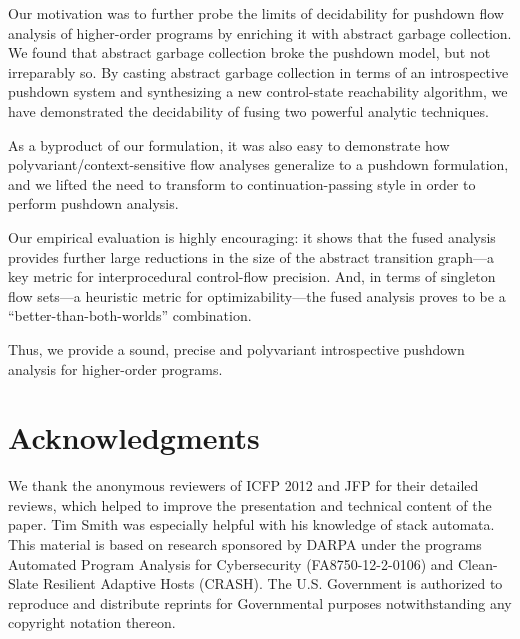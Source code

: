 Our motivation was to further probe the limits of decidability
for pushdown flow analysis of higher-order programs
by enriching it with abstract garbage collection.
We found that abstract garbage collection broke
the pushdown model, but not irreparably so.
By casting abstract garbage collection in terms of
an introspective pushdown system and synthesizing
a new control-state reachability algorithm, we have 
demonstrated the decidability of fusing two
powerful analytic techniques.

As a byproduct of our formulation, it was also easy
to demonstrate how polyvariant/context-sensitive 
flow analyses generalize to a pushdown formulation,
and we lifted the need to transform to continuation-passing style
in order to perform pushdown analysis.


Our empirical evaluation is highly encouraging: it shows that the fused
analysis provides further large reductions in the size of the abstract
transition graph---a key metric for interprocedural control-flow precision.
And, in terms of singleton flow sets---a heuristic metric for optimizability---the fused 
analysis proves to be a ``better-than-both-worlds'' combination.

Thus, we provide a sound, precise and polyvariant introspective
pushdown analysis for higher-order programs.



\section*{Acknowledgments}
We thank the anonymous reviewers of ICFP 2012 and JFP for their
detailed reviews, which helped to improve the presentation and
technical content of the paper.
Tim Smith was especially helpful with his knowledge of stack automata.
This material is based on research sponsored by DARPA under the programs 
Automated Program Analysis for Cybersecurity (FA8750-12-2-0106) and 
Clean-Slate Resilient Adaptive Hosts (CRASH). 
The U.S. Government is authorized to reproduce and
distribute reprints for Governmental purposes notwithstanding any copyright
notation thereon.








